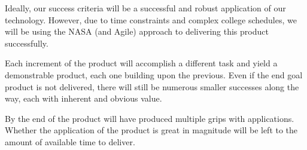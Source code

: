 Ideally, our success criteria will be a successful and robust application of our \productname{} technology. However, due to time constraints and complex college schedules, we will be using the NASA (and Agile) approach to delivering this product successfully. 

Each increment of the product will accomplish a different task and yield a demonstrable product, each one building upon the previous. Even if the end goal product is not delivered, there will still be numerous smaller successes along the way, each with inherent and obvious value.

By the end of the product will have produced multiple grips with applications. Whether the application of the product is great in magnitude will be left to the amount of available time to deliver.